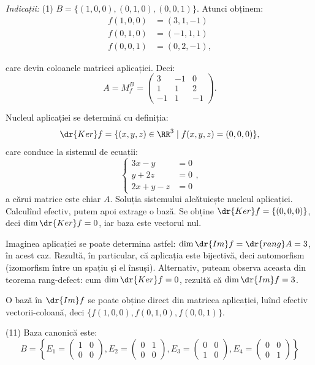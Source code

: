 \emph{Indicații:} (1) $ B = \{ (1, 0, 0), (0, 1, 0), (0, 0, 1) \} $. Atunci obținem:
\begin{align*}
    f(1, 0, 0) &= (3, 1, -1) \\
    f(0, 1, 0) &= (-1, 1, 1) \\
    f(0, 0, 1) &= (0, 2, -1),
\end{align*}

care devin coloanele matricei aplicației. Deci:
\[
    A = M_f^B = %
    \begin{pmatrix}
        3 & -1 & 0 \\
        1 & 1 & 2 \\
        -1 & 1 & -1
    \end{pmatrix}.
\]

Nucleul aplicației se determină cu definiția:
\[
    \dr{Ker}f = \{(x, y, z) \in \RR^3 \mid f(x, y, z) = (0, 0, 0) \},
\]
care conduce la sistemul de ecuații:
\[
    \begin{cases}
        3x - y &= 0 \\
        y + 2z &= 0 \\
        2x + y - z &= 0
    \end{cases},
\]
a cărui matrice este chiar $ A $. Soluția sistemului alcătuiește nucleul aplicației.
Calculînd efectiv, putem apoi extrage o bază. Se obține $ \dr{Ker}f = \{ (0, 0, 0) \} $,
deci $ \dim \dr{Ker}f = 0 $, iar baza este vectorul nul.

Imaginea aplicației se poate determina astfel: $ \dim \dr{Im} f = \dr{rang} A = 3 $,
în acest caz. Rezultă, în particular, că aplicația este bijectivă, deci automorfism
(izomorfism între un spațiu și el însuși). Alternativ, puteam observa aceasta din
teorema rang-defect: cum $ \dim\dr{Ker}f = 0 $, rezultă că $ \dim \dr{Im}f = 3 $.

O bază în $ \dr{Im}f $ se poate obține direct din matricea aplicației, luînd efectiv
vectorii-coloană, deci $ \{f(1, 0, 0), f(0, 1, 0), f(0, 0, 1) \} $.

\vspace{1cm}

(11) Baza canonică este:
\[
    B = \left\{ %
        E_1 = \begin{pmatrix} 1 & 0 \\ 0 & 0 \end{pmatrix}, %
        E_2 = \begin{pmatrix} 0 & 1 \\ 0 & 0 \end{pmatrix},
        E_3 = \begin{pmatrix} 0 & 0 \\ 1 & 0 \end{pmatrix},
        E_4 = \begin{pmatrix} 0 & 0 \\ 0 & 1 \end{pmatrix}
    \right\}
\]

